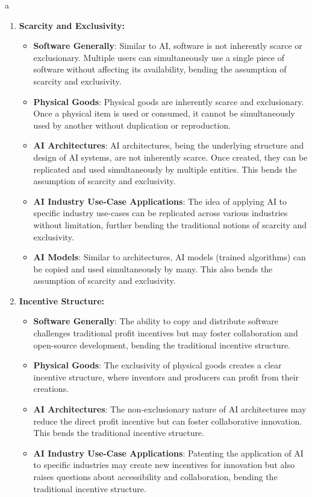 a\documentclass{article}[10pt]
\begin{document}
\begin{enumerate}
    \item \textbf{Scarcity and Exclusivity:}
    \begin{itemize}
	   \item \textbf{Software Generally}: Similar to AI, software is not inherently scarce or exclusionary. Multiple users can simultaneously use a single piece of software without affecting its availability, bending the assumption of scarcity and exclusivity.
	   \item \textbf{Physical Goods}: Physical goods are inherently scarce and exclusionary. Once a physical item is used or consumed, it cannot be simultaneously used by another without duplication or reproduction.
	   \item \textbf{AI Architectures}: AI architectures, being the underlying structure and design of AI systems, are not inherently scarce. Once created, they can be replicated and used simultaneously by multiple entities. This bends the assumption of scarcity and exclusivity.
	   \item \textbf{AI Industry Use-Case Applications}: The idea of applying AI to specific industry use-cases can be replicated across various industries without limitation, further bending the traditional notions of scarcity and exclusivity.
	   \item \textbf{AI Models}: Similar to architectures, AI models (trained algorithms) can be copied and used simultaneously by many. This also bends the assumption of scarcity and exclusivity.
    \end{itemize}
    \item \textbf{Incentive Structure:}
    \begin{itemize}
    	\item \textbf{Software Generally}: The ability to copy and distribute software challenges traditional profit incentives but may foster collaboration and open-source development, bending the traditional incentive structure.
    	\item \textbf{Physical Goods}: The exclusivity of physical goods creates a clear incentive structure, where inventors and producers can profit from their creations.
    	\item \textbf{AI Architectures}: The non-exclusionary nature of AI architectures may reduce the direct profit incentive but can foster collaborative innovation. This bends the traditional incentive structure.
    	\item \textbf{AI Industry Use-Case Applications}: Patenting the application of AI to specific industries may create new incentives for innovation but also raises questions about accessibility and collaboration, bending the traditional incentive structure.

\end{itemize}
\end{enumerate}
\end{document}
